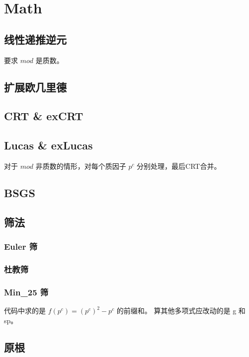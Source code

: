 \documentclass[../template.tex]{subfiles}
\begin{document}
\section{Math}

\subsection{线性递推逆元}
	要求 $mod$ 是质数。

\subsection{扩展欧几里德}

\subsection{CRT \& exCRT}

\subsection{Lucas \& exLucas}
	对于 $mod$ 非质数的情形，对每个质因子 $p^c$ 分别处理，最后CRT合并。
	

\subsection{BSGS}

\subsection{筛法}
	\subsubsection{Euler 筛}
	\subsubsection{杜教筛}
	\subsubsection{Min\_25 筛}
		代码中求的是 $f(p^c)=(p^c)^2-p^c$ 的前缀和。
		算其他多项式应改动的是 g 和 sp。

\subsection{原根}
\end{document}
